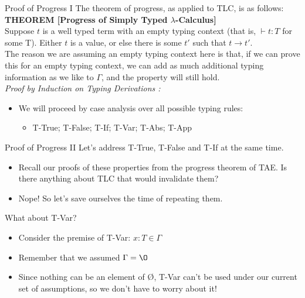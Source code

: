 \documentclass[11pt]{beamer}
\begin{document}
\begin{frame}[fragile=singleslide]{Proof of Progress I}
The theorem of progress, as applied to TLC, is as follows: \\

\textbf{THEOREM [Progress of Simply Typed $\lambda$-Calculus]} \\
Suppose $t$ is a well typed term with an empty typing context (that is, $\vdash t : T$ for some T).  Either $t$ is a value, or else there is some $t'$ such that $t \rightarrow t'$. \\ 
\vspace{1em}
The reason we are assuming an empty typing context here is that, if we can prove this for an empty typing context, we can add as much additional typing  information as we like to $\Gamma$, and the property will still hold.  \\
\vspace{1em}
\emph{Proof by Induction on Typing Derivations :}
\begin{itemize}
\item We will proceed by case analysis over all possible typing rules:
\begin{itemize}
\item T-True; T-False; T-If; T-Var; T-Abs; T-App 
\end{itemize}
\end{itemize} 
\end{frame}

\begin{frame}[fragile=singleslide]{Proof of Progress II}
Let's address T-True, T-False and T-If at the same time.
\begin{itemize}
\item Recall our proofs of these properties from the progress theorem of TAE.  Is there anything about TLC that would invalidate them?
\item Nope! So let's save ourselves the time of repeating them.
\end{itemize}
What about T-Var?
\begin{itemize}
\item Consider the premise of T-Var: $x : T \in \Gamma$
\item Remember that we assumed $\Gamma = \O$
\item Since nothing can be an element of \O, T-Var can't be used under our current set of assumptions, so we don't have to worry about it! 
\end{itemize}
\end{frame}
\end{document}
